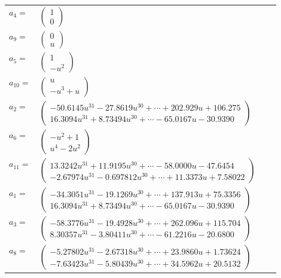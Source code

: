 \documentclass[1p]{elsarticle_modified}
\theoremstyle{definition}
\begin{document}
\begin{tabular}{m{7pt} m{180pt} m{7pt} m{180pt} }
\flushright $a_{4}=$&$\begin{pmatrix}1\\0\end{pmatrix}$ \\
\flushright $a_{9}=$&$\begin{pmatrix}0\\u\end{pmatrix}$ \\
\flushright $a_{5}=$&$\begin{pmatrix}1\\- u^2\end{pmatrix}$ \\
\flushright $a_{10}=$&$\begin{pmatrix}u\\- u^3+u\end{pmatrix}$ \\
\flushright $a_{2}=$&$\begin{pmatrix}-50.6145 u^{31}-27.8619 u^{30}+\cdots+202.929 u+106.275\\16.3094 u^{31}+8.73494 u^{30}+\cdots-65.0167 u-30.9390\end{pmatrix}$ \\
\flushright $a_{6}=$&$\begin{pmatrix}- u^2+1\\u^4-2 u^2\end{pmatrix}$ \\
\flushright $a_{11}=$&$\begin{pmatrix}13.3242 u^{31}+11.9195 u^{30}+\cdots-58.0000 u-47.6454\\-2.67974 u^{31}-0.697812 u^{30}+\cdots+11.3373 u+7.58022\end{pmatrix}$ \\
\flushright $a_{1}=$&$\begin{pmatrix}-34.3051 u^{31}-19.1269 u^{30}+\cdots+137.913 u+75.3356\\16.3094 u^{31}+8.73494 u^{30}+\cdots-65.0167 u-30.9390\end{pmatrix}$ \\
\flushright $a_{3}=$&$\begin{pmatrix}-58.3776 u^{31}-19.4928 u^{30}+\cdots+262.096 u+115.704\\8.30357 u^{31}-3.80411 u^{30}+\cdots-61.2216 u-20.6800\end{pmatrix}$ \\
\flushright $a_{8}=$&$\begin{pmatrix}-5.27802 u^{31}-2.67318 u^{30}+\cdots+23.9860 u+1.73624\\-7.63423 u^{31}-5.80439 u^{30}+\cdots+34.5962 u+20.5132\end{pmatrix}$ \\

\end{tabular}
\end{document}
